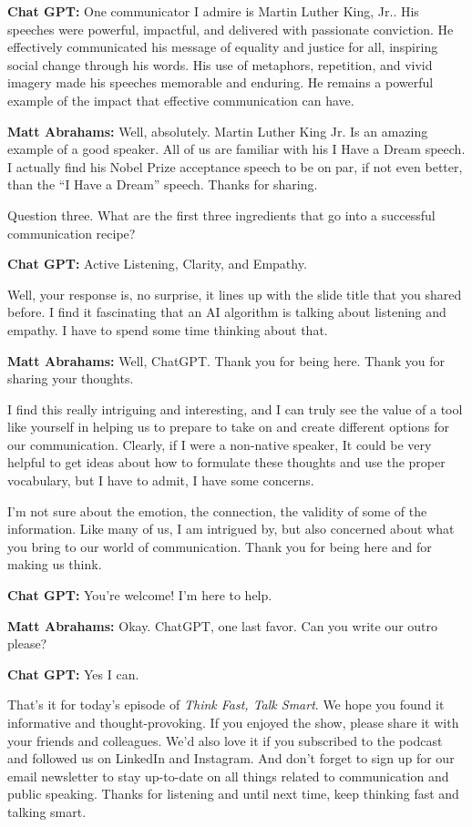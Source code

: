 \documentclass{article}
\begin{document}
\textbf{Chat GPT: }One communicator I admire is Martin Luther King, Jr.. His speeches were powerful, impactful, and delivered with passionate conviction. He effectively communicated his message of equality and justice for all, inspiring social change through his words. His use of metaphors, repetition, and vivid imagery made his speeches memorable and enduring. He remains a powerful example of the impact that effective communication can have.

\textbf{Matt Abrahams: }Well, absolutely. Martin Luther King Jr. Is an amazing example of a good speaker. All of us are familiar with his I Have a Dream speech. I actually find his Nobel Prize acceptance speech to be on par, if not even better, than the “I Have a Dream” speech. Thanks for sharing.

Question three. What are the first three ingredients that go into a successful communication recipe?

\textbf{Chat GPT: }Active Listening, Clarity, and Empathy.

Well, your response is, no surprise, it lines up with the slide title that you shared before. I find it fascinating that an AI algorithm is talking about listening and empathy. I have to spend some time thinking about that.

\textbf{Matt Abrahams: }Well, ChatGPT. Thank you for being here. Thank you for sharing your thoughts.

I find this really intriguing and interesting, and I can truly see the value of a tool like yourself in helping us to prepare to take on and create different options for our communication. Clearly, if I were a non-native speaker, It could be very helpful to get ideas about how to formulate these thoughts and use the proper vocabulary, but I have to admit, I have some concerns.

I’m not sure about the emotion, the connection, the validity of some of the information. Like many of us, I am intrigued by, but also concerned about what you bring to our world of communication. Thank you for being here and for making us think.

\textbf{Chat GPT: }You’re welcome! I’m here to help.

\textbf{Matt Abrahams: }Okay. ChatGPT, one last favor. Can you write our outro please?

\textbf{Chat GPT: }Yes I can.

That’s it for today’s episode of \textsl{Think Fast, Talk Smart}. We hope you found it informative and thought-provoking. If you enjoyed the show, please share it with your friends and colleagues. We’d also love it if you subscribed to the podcast and followed us on LinkedIn and Instagram. And don’t forget to sign up for our email newsletter to stay up-to-date on all things related to communication and public speaking. Thanks for listening and until next time, keep thinking fast and talking smart.
\end{document}

